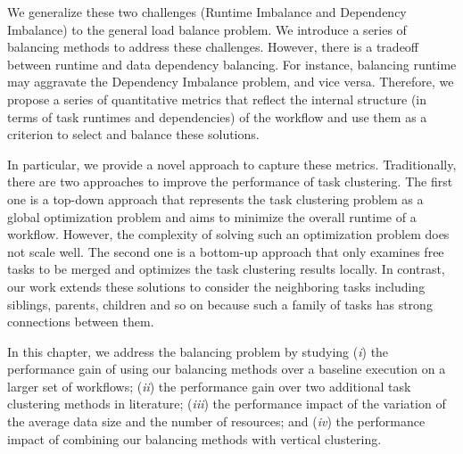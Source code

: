 We generalize these two challenges (Runtime Imbalance and Dependency Imbalance) to the general load balance problem. We introduce a series of balancing methods to address these challenges. However, there is a tradeoff between runtime and data dependency balancing. For instance, balancing runtime may aggravate the Dependency Imbalance problem, and vice versa. Therefore, we propose a series of quantitative metrics that reflect the internal structure (in terms of task runtimes and dependencies) of the workflow and use them as a criterion to select and balance these solutions.


In particular, we provide a novel approach to capture these metrics. Traditionally, there are two approaches to improve the performance of task clustering. The first one is a top-down approach \cite{Integration2012} that represents the task clustering problem as a global optimization problem and aims to minimize the overall runtime of a workflow. However, the complexity of solving such an optimization problem does not scale well. The second one is a bottom-up approach \cite{Muthuvelu2005}\cite{Liu2009} that only examines free tasks to be merged and optimizes the task clustering results locally. In contrast, our work extends these solutions to consider the neighboring tasks including siblings, parents, children and so on because such a family of tasks has strong connections between them. 

In this chapter, we address the balancing problem by studying (\emph{i}) the performance gain of using our balancing methods over a baseline execution on a larger set of workflows; (\emph{ii}) the performance gain over two additional task clustering methods in literature; (\emph{iii}) the performance impact of the variation of the average data size and the number of resources; and (\emph{iv}) the performance impact of combining our balancing methods with vertical clustering.



